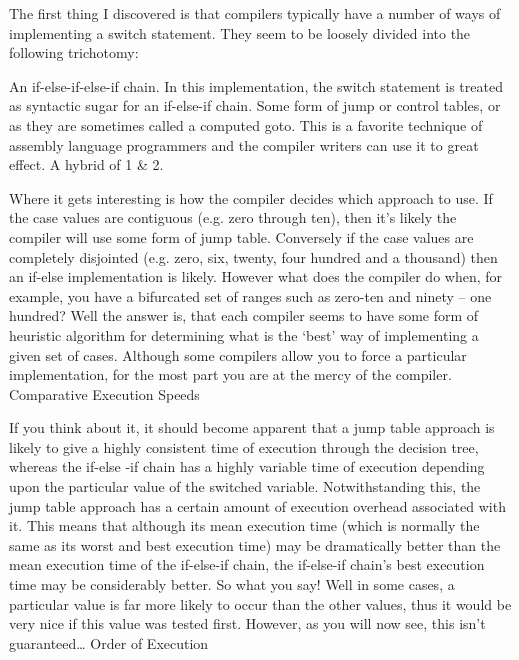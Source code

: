 {{{{{{{{{{The first thing I discovered is that compilers typically have a number of ways of implementing a switch statement. They seem to be loosely divided into the following trichotomy:

    An if-else-if-else-if chain. In this implementation, the switch statement is treated as syntactic sugar for an if-else-if chain.
    Some form of jump or control tables, or as they are sometimes called a computed goto. This is a favorite technique of assembly language programmers and the compiler writers can use it to great effect.
    A hybrid of 1 & 2.

Where it gets interesting is how the compiler decides which approach to use. If the case values are contiguous (e.g. zero through ten), then it’s likely the compiler will use some form of jump table. Conversely if the case values are completely disjointed (e.g. zero, six, twenty, four hundred and a thousand) then an if-else implementation is likely. However what does the compiler do when, for example, you have a bifurcated set of ranges such as zero-ten and ninety – one hundred? Well the answer is, that each compiler seems to have some form of heuristic algorithm for determining what is the ‘best’ way of implementing a given set of cases. Although some compilers allow you to force a particular implementation, for the most part you are at the mercy of the compiler.
Comparative Execution Speeds

If you think about it, it should become apparent that a jump table approach is likely to give a highly consistent time of execution through the decision tree, whereas the if-else -if chain has a highly variable time of execution depending upon the particular value of the switched variable.  Notwithstanding this, the jump table approach has a certain amount of execution overhead associated with it. This means that although its  mean execution time (which is normally the same as its worst and best execution time) may be dramatically better than the mean execution time of the if-else-if chain, the if-else-if chain’s best execution time may be considerably better. So what you say! Well in some cases, a particular value is far more likely to occur than the other values, thus it would be very nice if this value was tested first. However, as you will now see, this isn’t guaranteed…
Order of Execution

}}}}}}}}}}
